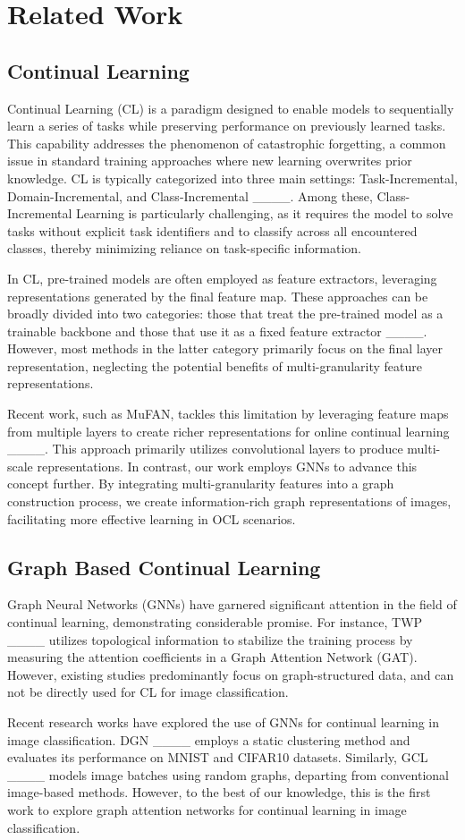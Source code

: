 \section{Related Work}
\subsection{Continual Learning}
Continual Learning (CL) is a paradigm designed to enable models to sequentially learn a series of tasks while preserving performance on previously learned tasks. This capability addresses the phenomenon of catastrophic forgetting, a common issue in standard training approaches where new learning overwrites prior knowledge. CL is typically categorized into three main settings: Task-Incremental, Domain-Incremental, and Class-Incremental ____. Among these, Class-Incremental Learning is particularly challenging, as it requires the model to solve tasks without explicit task identifiers and to classify across all encountered classes, thereby minimizing reliance on task-specific information.

In CL, pre-trained models are often employed as feature extractors, leveraging representations generated by the final feature map. These approaches can be broadly divided into two categories: those that treat the pre-trained model as a trainable backbone and those that use it as a fixed feature extractor ____. However, most methods in the latter category primarily focus on the final layer representation, neglecting the potential benefits of multi-granularity feature representations.

Recent work, such as MuFAN, tackles this limitation by leveraging feature maps from multiple layers to create richer representations for online continual learning ____. This approach primarily utilizes convolutional layers to produce multi-scale representations. In contrast, our work employs GNNs to advance this concept further. By integrating multi-granularity features into a graph construction process, we create information-rich graph representations of images, facilitating more effective learning in OCL scenarios.

\subsection{Graph Based Continual Learning}
Graph Neural Networks (GNNs) have garnered significant attention in the field of continual learning, demonstrating considerable promise. For instance, TWP ____ utilizes topological information to stabilize the training process by measuring the attention coefficients in a Graph Attention Network (GAT). However, existing studies predominantly focus on graph-structured data, and can not be directly used for CL for image classification.

Recent research works have explored the use of GNNs for continual learning in image classification. DGN ____ employs a static clustering method and evaluates its performance on MNIST and CIFAR10 datasets. Similarly, GCL ____ models image batches using random graphs, departing from conventional image-based methods. However, to the best of our knowledge, this is the first work to explore graph attention networks for continual learning in image classification.
